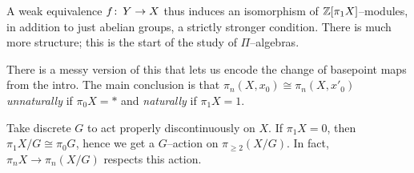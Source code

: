 \begin{subappendices}
\begin{remark}
A weak equivalence $f\colon\thinspace Y \to X$ thus induces an isomorphism of $\mathbb Z[\pi_1 X]$--modules, in addition to just abelian groups, a strictly stronger condition.  There is much more structure; this is the start of the study of $\Pi$--algebras.
\end{remark}

\begin{remark}
There is a messy version of this that lets us encode the change of basepoint maps from the intro.  The main conclusion is that $\pi_n(X, x_0) \cong \pi_n(X, x'_0)$ \emph{unnaturally} if $\pi_0 X = *$ and \emph{naturally} if $\pi_1 X = 1$.
\end{remark}

\begin{remark}
Take discrete $G$ to act properly discontinuously on $X$.  If $\pi_1 X = 0$, then $\pi_1 X/G \cong \pi_0 G$, hence we get a $G$--action on $\pi_{\ge 2}(X/G)$.  In fact, $\pi_n X \to \pi_n(X/G)$ respects this action.
\end{remark}

\end{subappendices}
